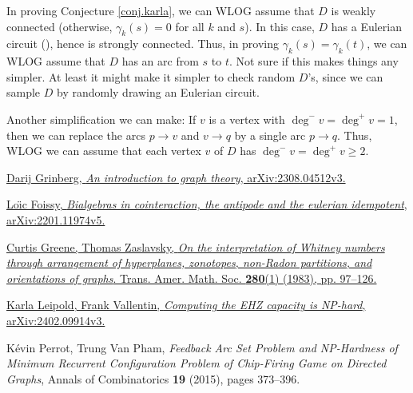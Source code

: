 \documentclass[numbers=enddot,12pt,final,onecolumn,notitlepage]{scrartcl}%
\theoremstyle{definition}
\newenvironment{noncompile}{}{}
\theoremstyle{plainsl}
\begin{document}
\begin{noncompile}
In proving Conjecture \ref{conj.karla}, we can WLOG assume that $D$ is weakly
connected (otherwise, $\gamma_{k}\left(  s\right)  =0$ for all $k$ and $s$).
In this case, $D$ has a Eulerian circuit (\cite[Theorem 4.7.2]{22s}), hence is
strongly connected. Thus, in proving $\gamma_{k}\left(  s\right)  =\gamma
_{k}\left(  t\right)  $, we can WLOG assume that $D$ has an arc from $s$ to
$t$. Not sure if this makes things any simpler. At least it might make it
simpler to check random $D$'s, since we can sample $D$ by randomly drawing an
Eulerian circuit.

Another simplification we can make: If $v$ is a vertex with $\deg^{-}%
v=\deg^{+}v=1$, then we can replace the arcs $p\rightarrow v$ and
$v\rightarrow q$ by a single arc $p\rightarrow q$. Thus, WLOG we can assume
that each vertex $v$ of $D$ has $\deg^{-}v=\deg^{+}v\geq2$.
\end{noncompile}

\begin{thebibliography}{99999999}                                                                                         %


\href{https://arxiv.org/abs/2308.04512v3}{Darij Grinberg,
\textit{An introduction to graph theory}, arXiv:2308.04512v3.}

%
\href{https://arxiv.org/abs/2201.11974v5}{Lo\"{\i}c Foissy, \textit{Bialgebras
in cointeraction, the antipode and the eulerian idempotent},
arXiv:2201.11974v5.}

%
\href{https://doi.org/10.1090/S0002-9947-1983-0712251-1}{Curtis Greene, Thomas
Zaslavsky, \textit{On the interpretation of Whitney numbers through
arrangement of hyperplanes, zonotopes, non-Radon partitions, and orientations
of graphs}. Trans. Amer. Math. Soc. \textbf{280}(1) (1983), pp. 97--126.}

\href{https://arxiv.org/abs/2402.09914v3}{Karla
Leipold, Frank Vallentin, \textit{Computing the EHZ capacity is NP-hard},
arXiv:2402.09914v3.}

K\'{e}vin Perrot, Trung Van Pham, \textit{Feedback
Arc Set Problem and NP-Hardness of Minimum Recurrent Configuration Problem of
Chip-Firing Game on Directed Graphs}, Annals of Combinatorics \textbf{19}
(2015), pages 373--396.
\end{thebibliography}
\end{document}
